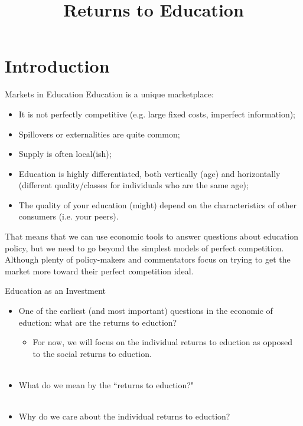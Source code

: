 \documentclass{beamer}
\title{Returns to Education}
\begin{document}
\maketitle

\section{Introduction}

\begin{frame}{Markets in Education}
Education is a unique marketplace:
	\begin{itemize}
	\item It is not perfectly competitive (e.g. large fixed costs, imperfect information);
	\item Spillovers or externalities are quite common;
	\item Supply is often local(ish);
	\item Education is highly differentiated, both vertically (age) and horizontally (different quality/classes for individuals who are the same age);
	\item The quality of your education (might) depend on the characteristics of other consumers (i.e. your peers).
	\end{itemize}
That means that we can use economic tools to answer questions about education policy, but we need to go beyond the simplest models of perfect competition. Although plenty of policy-makers and commentators focus on trying to get the market more toward their perfect competition ideal.
\end{frame}

\begin{frame}[<+->]{Education as an Investment}
\begin{itemize}
\item One of the earliest (and most important) questions in the economic of eduction: what are the returns to eduction?
	\begin{itemize}
	\item For now, we will focus on the individual returns to eduction as opposed to the social returns to eduction.  \\~\\
	\end{itemize}
\item What do we mean by the ``returns to eduction?" \\~\\
\item Why do we care about the individual returns to eduction?
\end{itemize}
\end{frame}
\end{document}
